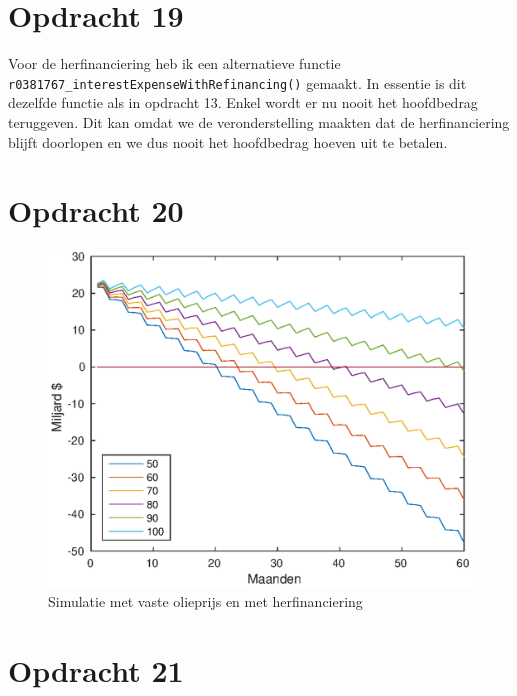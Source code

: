 \documentclass[11pt,a4paper]{article}
\begin{document}
\section*{Opdracht 19}


\noindent
Voor de herfinanciering heb ik een alternatieve functie \texttt{r0381767\_interestExpenseWithRefinancing()} gemaakt. In essentie is dit dezelfde functie als in opdracht 13. Enkel wordt er nu nooit het hoofdbedrag teruggeven. Dit kan omdat we de veronderstelling maakten dat de herfinanciering blijft doorlopen en we dus nooit het hoofdbedrag hoeven uit te betalen.



\section*{Opdracht 20}

\begin{figure}[H]
\centering
\includegraphics[scale=0.75]{opdracht20}
\caption{Simulatie met vaste olieprijs en met herfinanciering}
\end{figure}



\section*{Opdracht 21}
\end{document}
